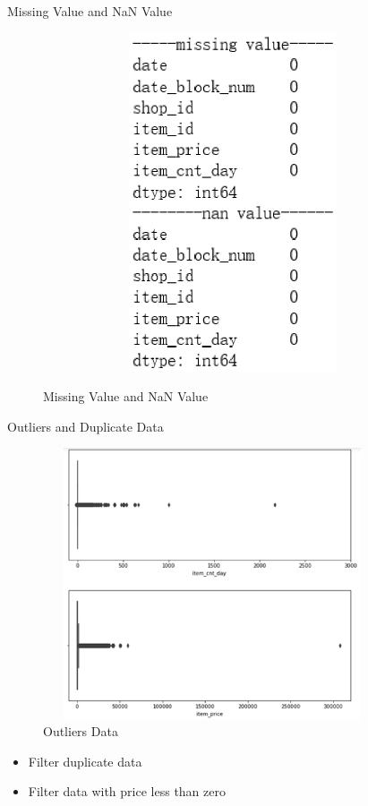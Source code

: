 \documentclass[
size=12pt,
paper=smartboard,  %
mode=present, 		%
display=slides, 	%
style=tuliplab,  	%
pauseslide,
fleqn,leqno]{powerdot}
\begin{document}
	\begin{slide}[toc=Missing Value and NaN Value]{Missing Value and NaN Value}
		
		\begin{figure}[htb]
			\centering
			\includegraphics[width=12cm, height=10cm]{figures/miss.eps}\\
			\caption{Missing Value and NaN Value
			}\label{straddltimeScale}
		\end{figure}
	\end{slide}
	\begin{slide}[toc=Outliers and Duplicate Data]{Outliers and Duplicate Data}
		\begin{figure}[htb]
			\centering
			\includegraphics[width=10cm, height=8cm]{figures/outliers.eps}
			\caption{Outliers Data
			}\label{straddltimeScale}
		\end{figure}
		\begin{itemize}
			\item Filter duplicate data
			\smallskip
			\item Filter data with price less than zero
		\end{itemize}
	\end{slide}
\end{document}

